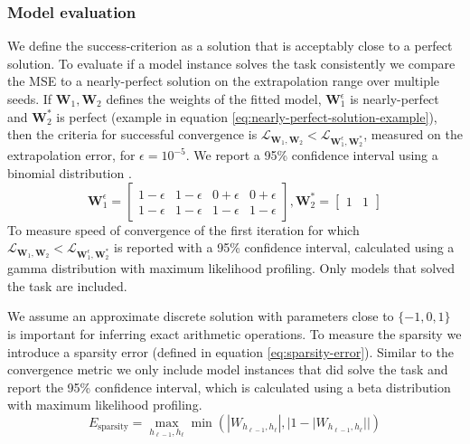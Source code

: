 \subsubsection{Model evaluation}
We define the success-criterion as a solution that is acceptably close to a perfect solution.
To evaluate if a model instance solves the task consistently we compare the MSE to a nearly-perfect solution on the extrapolation range over multiple seeds.
If $\mathbf{W}_1, \mathbf{W}_2$ defines the weights of the fitted model, $\mathbf{W}_1^\epsilon$ is nearly-perfect and $\mathbf{W}_2^*$ is perfect (example in equation \ref{eq:nearly-perfect-solution-example}), then the criteria for successful convergence is $\mathcal{L}_{\mathbf{W}_1, \mathbf{W}_2} < \mathcal{L}_{\mathbf{W}_1^\epsilon, \mathbf{W}_2^*}$, measured on the extrapolation error, for $\epsilon = 10^{-5}$. We report a 95\% confidence interval using a binomial distribution \cite{wilson-binomial}.
\begin{equation}
    \mathbf{W}_1^\epsilon = \begin{bmatrix}
    1 - \epsilon & 1 - \epsilon & 0 + \epsilon & 0 + \epsilon \\
    1 - \epsilon & 1 - \epsilon & 1 - \epsilon & 1 - \epsilon
    \end{bmatrix}, \mathbf{W}_2^* = \begin{bmatrix}
    1 & 1
    \end{bmatrix}
    \label{eq:nearly-perfect-solution-example}
\end{equation}
To measure speed of convergence of the first iteration for which $\mathcal{L}_{\mathbf{W}_1, \mathbf{W}_2} < \mathcal{L}_{\mathbf{W}_1^\epsilon, \mathbf{W}_2^*}$ is reported with a 95\% confidence interval, calculated using a gamma distribution with maximum likelihood profiling. Only models that solved the task are included.

We assume an approximate discrete solution with parameters close to $\{-1, 0, 1\}$ is important for inferring exact arithmetic operations.
To measure the sparsity we introduce a sparsity error (defined in equation \ref{eq:sparsity-error}).
Similar to the convergence metric we only include model instances that did solve the task and report the 95\% confidence interval, which is calculated using a beta distribution with maximum likelihood profiling.
\begin{equation}
E_\mathrm{sparsity} = \max_{h_{\ell-1}, h_{\ell}} \min(|W_{h_{\ell-1},h_\ell}|, |1 - |W_{h_{\ell-1},h_\ell}||)
\label{eq:sparsity-error}
\end{equation}

